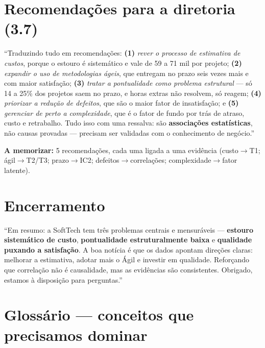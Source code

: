 \documentclass[a4paper, 11pt]{article}
\begin{document}
\section{Recomendações para a diretoria (3.7)}

\begin{roteiro}
``Traduzindo tudo em recomendações: \textbf{(1)} \emph{rever o processo de estimativa de custos},
porque o estouro é sistemático e vale de 59 a 71 mil por projeto; \textbf{(2)} \emph{expandir o
uso de metodologias ágeis}, que entregam no prazo seis vezes mais e com maior satisfação;
\textbf{(3)} \emph{tratar a pontualidade como problema estrutural} --- só 14 a 25\% dos projetos
saem no prazo, e horas extras não resolvem, só reagem; \textbf{(4)} \emph{priorizar a redução de
defeitos}, que são o maior fator de insatisfação; e \textbf{(5)} \emph{gerenciar de perto a
complexidade}, que é o fator de fundo por trás de atraso, custo e retrabalho. Tudo isso com uma
ressalva: são \textbf{associações estatísticas}, não causas provadas --- precisam ser validadas
com o conhecimento de negócio.''
\end{roteiro}

\textbf{A memorizar:} 5 recomendações, cada uma ligada a uma evidência (custo$\to$T1;
ágil$\to$T2/T3; prazo$\to$IC2; defeitos$\to$correlações; complexidade$\to$fator latente).

\section{Encerramento}

\begin{roteiro}
``Em resumo: a SoftTech tem três problemas centrais e mensuráveis --- \textbf{estouro
sistemático de custo}, \textbf{pontualidade estruturalmente baixa} e \textbf{qualidade puxando a
satisfação}. A boa notícia é que os dados apontam direções claras: melhorar a estimativa, adotar
mais o Ágil e investir em qualidade. Reforçando que correlação não é causalidade, mas as
evidências são consistentes. Obrigado, estamos à disposição para perguntas.''
\end{roteiro}

\section{Glossário --- conceitos que precisamos dominar}
\label{sec:glossario}
\end{document}
